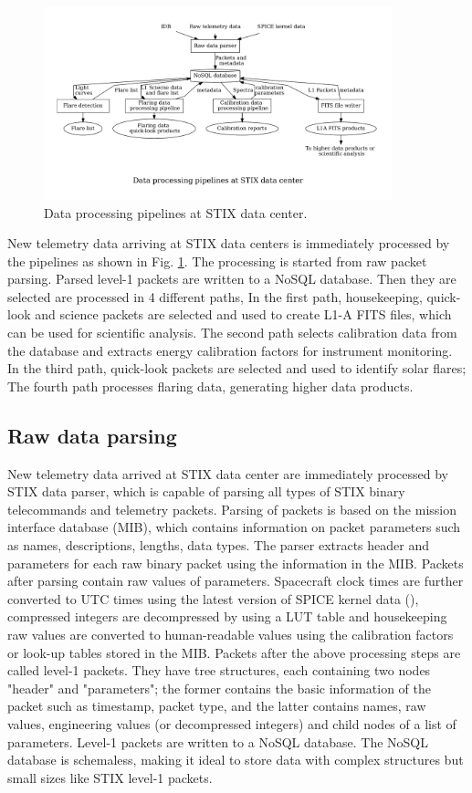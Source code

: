 \documentclass[referee]{aa} %
\begin{document}
\begin{figure}
    \centering
    \includegraphics[width=0.9\textwidth]{figures/pipelines.pdf}
    \caption{Data processing pipelines at STIX data center.}
    \label{fig:main_pipelines}
\end{figure}
New telemetry data arriving at STIX data centers is immediately processed by the pipelines as shown 
in Fig. \ref{fig:main_pipelines}. 
The processing is started from raw packet parsing. Parsed level-1 packets are written to a NoSQL database. 
Then they are selected  are processed in 4 different paths, 
In the first path,  housekeeping, quick-look and science packets 
are selected and used to create L1-A FITS files, 
which can be used for scientific analysis. 
The second path selects calibration data from the database and extracts energy calibration factors for 
instrument monitoring. In the third path, quick-look packets are selected and used to identify solar
flares; The fourth path processes flaring data, 
generating higher data products.   

\subsection{Raw data parsing}
New telemetry data arrived at STIX data center are immediately processed by STIX data parser, 
which is capable of parsing all types of STIX binary telecommands and telemetry packets.   
Parsing of packets is based on the mission interface database (MIB), which 
contains information on packet parameters such as names, descriptions, lengths,
data types. The parser extracts header and parameters for each raw binary packet
using the information in the MIB.
Packets after parsing contain raw values of parameters. 
 Spacecraft clock times are further converted to UTC times using 
the latest version of SPICE kernel data (\cite{spice1996,spice2018}), compressed integers are  
decompressed by using a LUT table and 
housekeeping raw values are converted to 
human-readable values using the calibration factors or look-up tables stored in the MIB. 
Packets after the above processing steps are called level-1 packets. They
have tree structures, each containing two nodes "header" and "parameters";
the former contains the basic information  of the packet such as timestamp, packet type,
and the latter contains names, 
raw values, engineering values (or decompressed integers) and child nodes of a list of parameters.
Level-1 packets are written 
to a NoSQL database. The NoSQL database is schemaless,  making it ideal to store data with complex
 structures but small sizes like STIX level-1 packets. 
\end{document}
